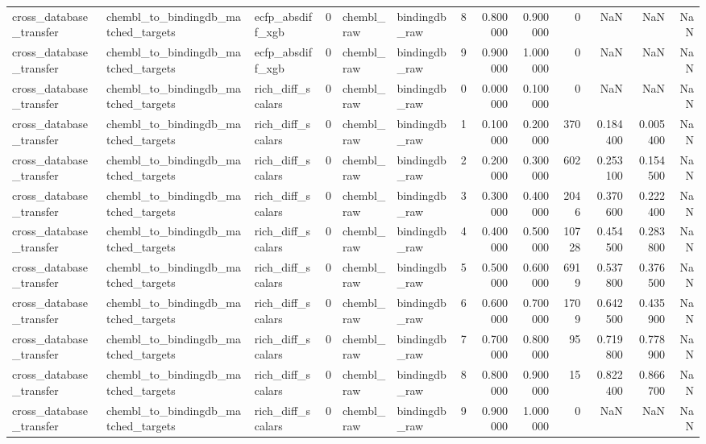 \begin{longtable}{lllrllrrrrrrr}
cross\_database\_transfer & chembl\_to\_bindingdb\_matched\_targets & ecfp\_absdiff\_xgb & 0 & chembl\_raw & bindingdb\_raw & 8 & 0.800000 & 0.900000 & 0 & NaN & NaN & NaN \\
cross\_database\_transfer & chembl\_to\_bindingdb\_matched\_targets & ecfp\_absdiff\_xgb & 0 & chembl\_raw & bindingdb\_raw & 9 & 0.900000 & 1.000000 & 0 & NaN & NaN & NaN \\
cross\_database\_transfer & chembl\_to\_bindingdb\_matched\_targets & rich\_diff\_scalars & 0 & chembl\_raw & bindingdb\_raw & 0 & 0.000000 & 0.100000 & 0 & NaN & NaN & NaN \\
cross\_database\_transfer & chembl\_to\_bindingdb\_matched\_targets & rich\_diff\_scalars & 0 & chembl\_raw & bindingdb\_raw & 1 & 0.100000 & 0.200000 & 370 & 0.184400 & 0.005400 & NaN \\
cross\_database\_transfer & chembl\_to\_bindingdb\_matched\_targets & rich\_diff\_scalars & 0 & chembl\_raw & bindingdb\_raw & 2 & 0.200000 & 0.300000 & 602 & 0.253100 & 0.154500 & NaN \\
cross\_database\_transfer & chembl\_to\_bindingdb\_matched\_targets & rich\_diff\_scalars & 0 & chembl\_raw & bindingdb\_raw & 3 & 0.300000 & 0.400000 & 2046 & 0.370600 & 0.222400 & NaN \\
cross\_database\_transfer & chembl\_to\_bindingdb\_matched\_targets & rich\_diff\_scalars & 0 & chembl\_raw & bindingdb\_raw & 4 & 0.400000 & 0.500000 & 10728 & 0.454500 & 0.283800 & NaN \\
cross\_database\_transfer & chembl\_to\_bindingdb\_matched\_targets & rich\_diff\_scalars & 0 & chembl\_raw & bindingdb\_raw & 5 & 0.500000 & 0.600000 & 6919 & 0.537800 & 0.376500 & NaN \\
cross\_database\_transfer & chembl\_to\_bindingdb\_matched\_targets & rich\_diff\_scalars & 0 & chembl\_raw & bindingdb\_raw & 6 & 0.600000 & 0.700000 & 1709 & 0.642500 & 0.435900 & NaN \\
cross\_database\_transfer & chembl\_to\_bindingdb\_matched\_targets & rich\_diff\_scalars & 0 & chembl\_raw & bindingdb\_raw & 7 & 0.700000 & 0.800000 & 95 & 0.719800 & 0.778900 & NaN \\
cross\_database\_transfer & chembl\_to\_bindingdb\_matched\_targets & rich\_diff\_scalars & 0 & chembl\_raw & bindingdb\_raw & 8 & 0.800000 & 0.900000 & 15 & 0.822400 & 0.866700 & NaN \\
cross\_database\_transfer & chembl\_to\_bindingdb\_matched\_targets & rich\_diff\_scalars & 0 & chembl\_raw & bindingdb\_raw & 9 & 0.900000 & 1.000000 & 0 & NaN & NaN & NaN \\

\end{longtable}
